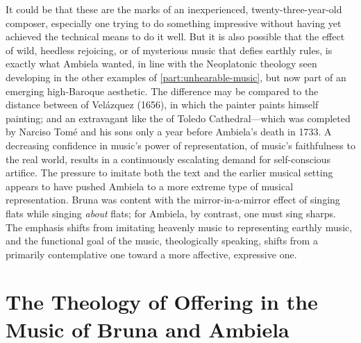 It could be that these are the marks of an inexperienced, twenty-three-year-old
composer, especially one trying to do something impressive without having yet
achieved the technical means to do it well.
But it is also possible that the effect of wild, heedless rejoicing, or of
mysterious music that defies earthly rules, is exactly what Ambiela wanted, in
line with the Neoplatonic theology seen developing in the other examples of
\cref{part:unhearable-music}, but now part of an emerging high-Baroque
aesthetic.  
The difference may be compared to the distance between  of
Velázquez (1656), in which the painter paints himself painting; and an
extravagant  like the  of Toledo
Cathedral---which was completed by Narciso Tomé and his sons only a year before
Ambiela's death in 1733.
A decreasing confidence in music's power of representation, of music's
faithfulness to the real world, results in a continuously escalating demand for
self-conscious artifice.  
The pressure to imitate both the text and the earlier musical setting appears
to have pushed Ambiela to a more extreme type of musical representation.
Bruna was content with the mirror-in-a-mirror effect of singing flats while
singing \emph{about} flats; for Ambiela, by contrast, one must sing sharps.
The emphasis shifts from imitating heavenly music to representing earthly
music, and the functional goal of the music, theologically speaking, shifts
from a primarily contemplative one toward a more affective, expressive one.

\section{The Theology of Offering in the Music of Bruna and Ambiela}

\endinput

\subsection{Poetic and Theological Themes: Mary in Music}

The poem set by Ambiela is clearly based on that set by Bruna.
The relationship between them is more similar to that between Jalón's \wtitle{Cantores} and Padilla's \wtitle{Voces} (chapter~\ref{ch:Padilla-Voces}) than the different versions of \wtitle{Suspended, cielos} (chapter~\ref{ch:Cererols}).
With \wtitle{Suspended, cielos} all the versions are similar enough to be considered variants of the same poem: some add verses or remove them, some alter a word here or there, but the basic structure and hematic content remain the same. 
The Jalón and Padilla villancicos, by contrast, are clearly derived from the same textual tradition, but are distinct poems with different poetic conceits and literary aesthetics.

